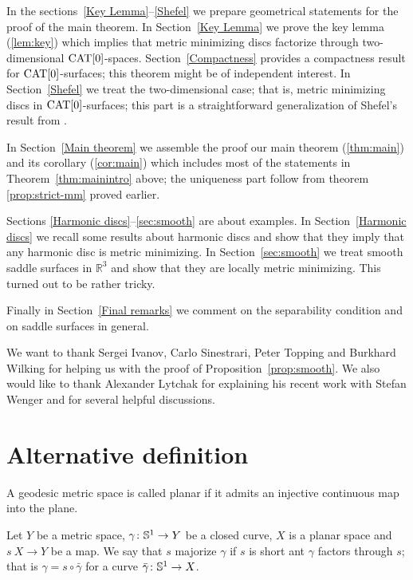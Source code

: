 \documentclass{article}
\begin{document}
In the sections~\ref{Key Lemma}--\ref{Shefel} we prepare geometrical statements for the proof of the main theorem.
In Section~\ref{Key Lemma} we prove the key lemma (\ref{lem:key}) which implies that metric minimizing discs factorize through 
two-dimensional $\mathop{\rm CAT}\nolimits[0]$-spaces. 
Section~\ref{Compactness} provides a compactness result for $\mathop{\rm CAT}\nolimits[0]$-surfaces;
this theorem might be of independent interest. 
In Section~\ref{Shefel} we treat the two-dimensional case; 
that is, metric minimizing discs in $\mathop{\rm CAT}\nolimits[0]$-surfaces;
this part is a straightforward generalization of Shefel's result from \cite{shefel-2D}. 

In Section~\ref{Main theorem} we assemble the proof our main theorem (\ref{thm:main}) and its corollary (\ref{cor:main}) 
which includes most of the statements in Theorem~\ref{thm:mainintro} above; the uniqueness part follow from theorem \ref{prop:strict-mm} 
proved earlier.

Sections \ref{Harmonic discs}--\ref{sec:smooth} are about examples.
In Section~\ref{Harmonic discs} we recall some results about  harmonic discs and show that they imply that any harmonic disc is metric minimizing. 
In Section~\ref{sec:smooth} we treat smooth saddle surfaces in $\mathbb{R}^3$ and show that they are locally metric minimizing.
This turned out to be rather tricky.

Finally in Section~\ref{Final remarks} we comment on the separability condition and on saddle 
surfaces in general.

We want to thank 
Sergei Ivanov, 
Carlo Sinestrari, 
Peter Topping 
and Burkhard Wilking 
for helping us with the proof of Proposition~\ref{prop:smooth}.
We also would like to thank Alexander Lytchak for explaining his recent work with Stefan Wenger and for several helpful discussions.

\section{Alternative definition}\label{sec:alt-def}

A geodesic metric space is called planar if it admits an injective continuous map into the plane.

Let $Y$ be a metric space,
$\gamma\colon\mathbb{S}^1\to Y$ be a closed curve,
$X$ is a planar space 
and $s\:X\to Y$ be a map.
We say that $s$ majorize $\gamma$ if $s$ is short ant $\gamma$ factors through $s$;
that is $\gamma=s\circ\bar\gamma$ for a curve $\bar\gamma\colon\mathbb{S}^1\to X$.
\end{document}
